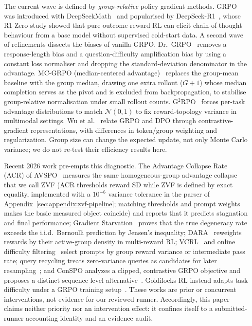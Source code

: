 The current wave is defined by \emph{group-relative} policy gradient methods.
GRPO was introduced with DeepSeekMath~\cite{shao2024deepseekmath} and
popularised by DeepSeek-R1~\cite{guo2025deepseekr1, guo2025deepseekr1nature}, whose R1-Zero study showed that
pure outcome-reward RL can elicit chain-of-thought behaviour from a base
model without supervised cold-start data. A second wave of refinements
dissects the biases of vanilla GRPO. Dr.~GRPO~\cite{tong2025drgrpo} removes a
response-length bias and a question-difficulty amplification bias by using a
constant loss normaliser and dropping the standard-deviation denominator in the
advantage. MC-GRPO (median-centered advantage)~\cite{mcgrpo2025} replaces the
group-mean baseline with the group median, drawing one extra rollout
($G{+}1$) whose median completion serves as the pivot and is excluded from
backpropagation, to stabilise group-relative normalisation under small
rollout counts. G$^{2}$RPO~\cite{hu2026openvlthinker} forces per-task
advantage distributions to match $\mathcal{N}(0,1)$ to fix reward-topology variance in
multimodal settings. Wu et al.~\cite{wu2025grpodpo} relate GRPO and DPO through contrastive-gradient
representations, with differences in token/group weighting and regularization.
Group size can change the expected update, not only Monte Carlo variance;
we do not re-test their efficiency results here.

Recent 2026 work pre-empts this diagnostic. The Advantage Collapse Rate
(ACR) of AVSPO~\cite{he2026advantage} measures the same homogeneous-group
advantage collapse that we call ZVF (ACR thresholds reward SD while ZVF is defined by exact equality, implemented
with a $10^{-6}$ variance tolerance in the parser of
Appendix~\ref{sec:appendix:zvf-pipeline}; matching thresholds
and prompt weights makes the basic measured object coincide) and reports that it predicts stagnation and final
performance; Gradient Starvation~\cite{nie2026gradstarvation} proves that the true
degeneracy rate exceeds the i.i.d.\ Bernoulli prediction by Jensen's
inequality; DARA~\cite{zheng2026dara} reweights rewards by their active-group
density in multi-reward RL; VCRL~\cite{jiang2025vcrl} and online difficulty
filtering~\cite{bae2025online} select prompts by group reward variance or
intermediate pass rate; query recycling treats zero-variance queries
as candidates for later resampling~\cite{coelho2026recycling}; and ConSPO
analyzes a clipped, contrastive GRPO objective and proposes a distinct
sequence-level alternative~\cite{zhang2026conspo}. Goldilocks RL instead
adapts task difficulty under a GRPO training setup~\cite{mahrooghi2026goldilocks}.
These works are prior or concurrent interventions, not evidence for our reviewed
runner. Accordingly, this paper claims neither priority nor an intervention
effect: it confines itself to a submitted-runner accounting identity and an
evidence audit.

